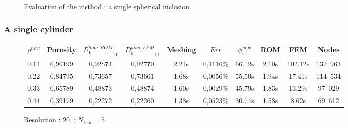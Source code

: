 {\begin{figure}[H]%
%
\begin{table}[H]
\begin{center}
%
%
\qquad
{}%
%
\end{center}
\end{table}
%
\caption{Evaluation of the method : a single spherical inclusion}
\end{figure}

\subsubsection{A single cylinder}

\begin{figure}[H]%
%
\begin{center}
\begin{tabular}{|c|c||c|c||c|c||c|c||c||c|}
\hline
\rowcolor{lightgray} $\rho^{new}$&Porosity&${D_k^{hom,ROM}}_{11}$&${D_k^{hom,FEM}}_{11}$&Meshing&$Err$&$\phi_i^{new}$&ROM&FEM&Nodes\\
\hline
0,11&0,96199&0,92874&0,92770&2.24s&0,1116\%&66.12s&2.10s&102.12s&132\ 963\\
\hline
0,22&0,84795&0,73657&0,73661&1.68s&0,0056\%&55.50s&1.94s&17.41s&114\ 534\\
\hline
0,33&0,65789&0,48873&0,48874&1.60s&0,0029\%&45.79s&1.83s&13.29s&97\ 029\\
\hline
0,44&0,39179&0,22272&0,22260&1.38s&0,0523\%&30.74s&1.58s&8.62s&69\ 612\\
\hline
\end{tabular}
\end{center}
\caption{Resolution : $20$\ ; $N_{rom}=5$}
%
\end{figure}

}

